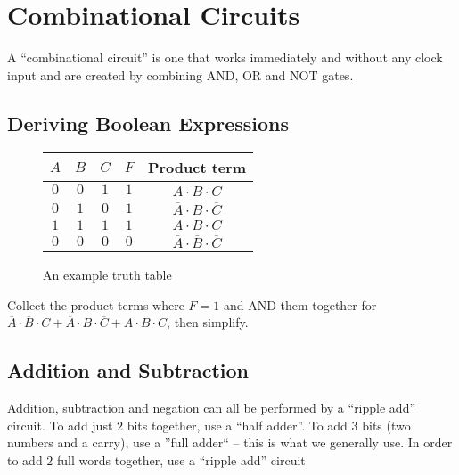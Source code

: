 \section{Combinational Circuits}\label{sec:combinational_circuits}

A ``combinational circuit'' is one that works immediately and without any clock input and are created by combining AND, OR and NOT gates.

\subsection{Deriving Boolean Expressions}\label{sub:deriving_boolean_expressions}

\begin{figure}[H]
	\centering
	\begin{tabular}{ccc|c|c}
		\toprule
		\(A\) & \(B\) & \(C\) & \(F\) & Product term                                         \\
		\midrule
		\(0\) & \(0\) & \(1\) & \(1\) & \(\overline{A}\cdot \overline{B}\cdot C\)            \\
		\(0\) & \(1\) & \(0\) & \(1\) & \(\overline{A}\cdot B\cdot \overline{C}\)            \\
		\(1\) & \(1\) & \(1\) & \(1\) & \(A\cdot B\cdot C\)                                  \\
		\(0\) & \(0\) & \(0\) & \(0\) & \(\overline{A}\cdot \overline{B}\cdot \overline{C}\) \\
	\end{tabular}
	\caption{An example truth table}
	\label{fig:example_truth_table}
\end{figure}

\noindent
Collect the product terms where \(F=1\) and AND them together for \(\overline{A}\cdot \overline{B}\cdot C + \overline{A}\cdot B\cdot \overline{C} +A\cdot B\cdot C\), then simplify.

\subsection{Addition and Subtraction}\label{sub:addition_and_subtraction}

Addition, subtraction and negation can all be performed by a ``ripple add'' circuit.
To add just \(2\) bits together, use a ``half adder''.
To add \(3\) bits (two numbers and a carry), use a ''full adder`` -- this is what we generally use.
In order to add \(2\) full words together, use a ``ripple add'' circuit

